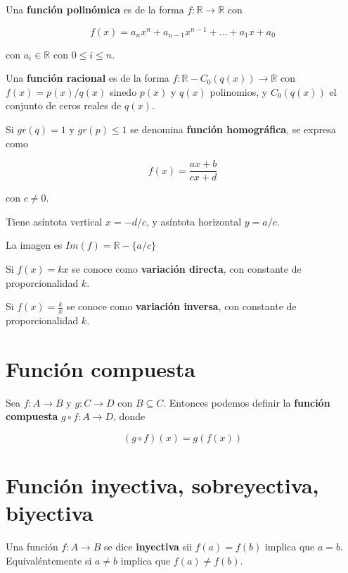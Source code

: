 \begin{definition} 
Una \textbf{función polinómica} es de la forma $f:\mathbb{R} \to \mathbb{R}$ con 

$$f(x) = a_n x^n + a_{n-1} x^{n-1} + \ldots + a_1 x + a_0 $$

con $a_i \in \mathbb{R}$ con $0 \leq i \leq n$.
\end{definition}

\begin{definition} 
Una \textbf{función racional} es de la forma $f : \mathbb{R} - C_0(q(x)) \to \mathbb{R}$ con $f(x) = p(x)/q(x)$ sinedo $p(x)$ y $q(x)$ polinomios, y $C_0(q(x))$ el conjunto de ceros reales de $q(x)$.

Si $gr(q) = 1$ y $gr(p) \leq 1$ se denomina \textbf{función homográfica}, se expresa como

$$f(x) = \frac{ax+b}{cx+d}$$

con $c \neq 0$.

Tiene asíntota vertical $x = -d/c$, y asíntota horizontal $y = a/c$.

La imagen es $Im(f) = \mathbb{R} - \{ a/c \}$

Si $f(x) = kx$ se conoce como \textbf{variación directa}, con constante de proporcionalidad $k$.

Si $f(x) = \frac{k}{x}$ se conoce como \textbf{variación inversa}, con constante de proporcionalidad $k$.
\end{definition}

\section{Función compuesta}

\begin{definition} 
Sea $f : A \to B$ y $g : C \to D$ con $B \subseteq C$.  Entonces podemos definir la \textbf{función compuesta} $g \circ f : A \to D$, donde 

$$(g \circ f)(x) = g(f(x))$$
\end{definition}

\section{Función inyectiva, sobreyectiva, biyectiva}

Una función $f : A \to B$ se dice \textbf{inyectiva}  sii $f(a) = f(b)$ implica que $a=b$.  Equivaléntemente si $a \neq b$ implica que $f(a) \neq f(b)$.

